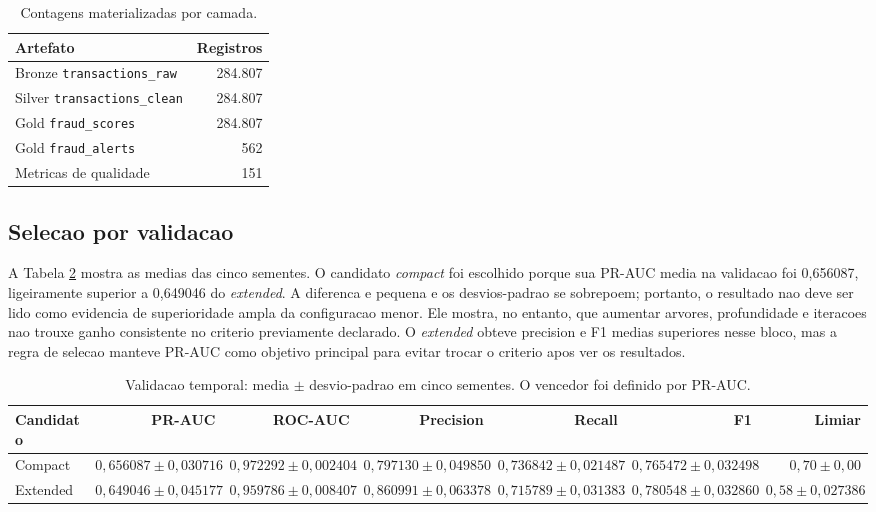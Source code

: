 \documentclass[10pt,twocolumn]{article}
\begin{document}
\begin{table}[ht]
\centering
\caption{Contagens materializadas por camada.}
\label{tab:layers}
\begin{tabular}{lr}
\toprule
Artefato & Registros \\
\midrule
Bronze \texttt{transactions\_raw} & 284.807 \\
Silver \texttt{transactions\_clean} & 284.807 \\
Gold \texttt{fraud\_scores} & 284.807 \\
Gold \texttt{fraud\_alerts} & 562 \\
Metricas de qualidade & 151 \\
\bottomrule
\end{tabular}
\end{table}

\subsection{Selecao por validacao}

A Tabela \ref{tab:validation} mostra as medias das cinco sementes. O candidato \textit{compact} foi escolhido porque sua PR-AUC media na validacao foi 0,656087, ligeiramente superior a 0,649046 do \textit{extended}. A diferenca e pequena e os desvios-padrao se sobrepoem; portanto, o resultado nao deve ser lido como evidencia de superioridade ampla da configuracao menor. Ele mostra, no entanto, que aumentar arvores, profundidade e iteracoes nao trouxe ganho consistente no criterio previamente declarado. O \textit{extended} obteve precision e F1 medias superiores nesse bloco, mas a regra de selecao manteve PR-AUC como objetivo principal para evitar trocar o criterio apos ver os resultados.

\begin{table}[t]
\centering
\caption{Validacao temporal: media $\pm$ desvio-padrao em cinco sementes. O vencedor foi definido por PR-AUC.}
\label{tab:validation}
\begin{tabular}{lrrrrrr}
\toprule
Candidato & PR-AUC & ROC-AUC & Precision & Recall & F1 & Limiar \\
\midrule
Compact & $0{,}656087\pm0{,}030716$ & $0{,}972292\pm0{,}002404$ & $0{,}797130\pm0{,}049850$ & $0{,}736842\pm0{,}021487$ & $0{,}765472\pm0{,}032498$ & $0{,}70\pm0{,}00$ \\
Extended & $0{,}649046\pm0{,}045177$ & $0{,}959786\pm0{,}008407$ & $0{,}860991\pm0{,}063378$ & $0{,}715789\pm0{,}031383$ & $0{,}780548\pm0{,}032860$ & $0{,}58\pm0{,}027386$ \\
\bottomrule
\end{tabular}
\end{table}
\end{document}
